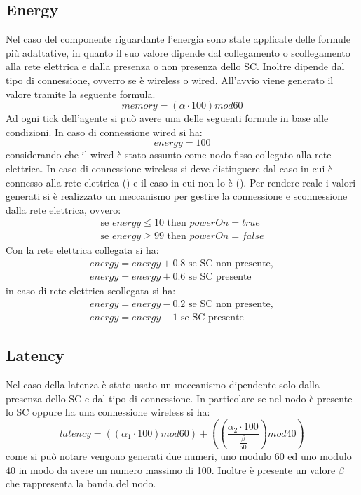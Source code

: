 \subsection{Energy}
Nel caso del componente riguardante l'energia sono state applicate delle formule più adattative, in quanto il suo valore dipende dal collegamento o scollegamento alla rete elettrica e dalla presenza o non presenza dello SC. Inoltre dipende dal tipo di connessione, ovverro se è wireless o wired. All'avvio viene generato il valore tramite la seguente formula.
\begin{equation}\label{eq:energy}
memory = (\alpha \cdot 100) mod 60
\end{equation}
Ad ogni tick dell'agente si può avere una delle seguenti formule in base alle condizioni. In caso di connessione wired si ha:
\begin{equation}
energy = 100
\end{equation}
considerando che il wired è stato assunto come nodo fisso collegato alla rete elettrica. In caso di connessione wireless si deve distinguere dal caso in cui è connesso alla rete elettrica () e il caso in cui non lo è (). Per rendere reale i valori generati si è realizzato un meccanismo per gestire la connessione e sconnessione dalla rete elettrica, ovvero:
\begin{gather}
\text{se }energy \leq 10\text{ then }powerOn = true \\
\text{se }energy \geq 99\text{ then }powerOn = false
\end{gather}
Con la rete elettrica collegata si ha:
\begin{gather}
energy = energy + 0.8 \text{ se SC non presente},\\
energy = energy + 0.6 \text{ se SC presente}
\end{gather}
in caso di rete elettrica scollegata si ha:
\begin{gather}
energy = energy - 0.2 \text{ se SC non presente},\\
energy = energy - 1 \text{ se SC presente}
\end{gather}
\subsection{Latency}
Nel caso della latenza è stato usato un meccanismo dipendente solo dalla presenza dello SC e dal tipo di connessione. In particolare se nel nodo è presente lo SC oppure ha una connessione wireless si ha:
\begin{equation}
latency = ((\alpha_{1} \cdot 100)mod60) + \left( \left(\frac{\alpha_{2} \cdot 100}{\frac{\beta}{50}}\right)mod40\right)
\end{equation}
come si può notare vengono generati due numeri, uno modulo 60 ed uno modulo 40 in modo da avere un numero massimo di 100. Inoltre è presente un valore $\beta$ che rappresenta la banda del nodo.
